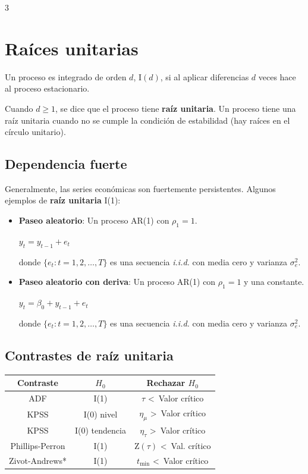 \documentclass[10pt, a4paper, landscape]{article}
\begin{document}
\begin{multicols}{3}
\columnbreak

\section*{Raíces unitarias}

Un proceso es integrado de orden \( d \), \( \text{I}(d) \), si al aplicar diferencias \( d \) veces hace al proceso estacionario.

Cuando \( d \geq 1 \), se dice que el proceso tiene \textbf{raíz unitaria}. Un proceso tiene una raíz unitaria cuando no se cumple la condición de estabilidad (hay raíces en el círculo unitario).

\subsection*{Dependencia fuerte}

Generalmente, las series económicas son fuertemente persistentes. Algunos ejemplos de \textbf{raíz unitaria} I(1):

\begin{itemize}[leftmargin=*]
	\item \textbf{Paseo aleatorio}: Un proceso AR(1) con \( \rho_{1} = 1 \).
	\begin{center}
		\( y_{t} = y_{t - 1} + e_{t} \)
	\end{center}
	donde \( \{ e_{t} : t = 1, 2, \ldots, T \} \) es una secuencia \textsl{i.i.d.} con media cero y varianza \( \sigma_{e}^{2} \).
	\item \textbf{Paseo aleatorio con deriva}: Un proceso AR(1) con \( \rho_{1} = 1 \) y una constante.
	\begin{center}
		\( y_{t} = \beta_{0} + y_{t - 1} + e_{t} \)
	\end{center}
	donde \( \{ e_{t} : t = 1, 2, \ldots, T \} \) es una secuencia \textsl{i.i.d.} con media cero y varianza \( \sigma_{e}^{2} \).
\end{itemize}

\subsection*{Contrastes de raíz unitaria}

\begin{center}
	\begin{tabular}{ c c c }
		Contraste       & \( H_{0} \)    & Rechazar \( H_{0} \)                              \\ \hline
		ADF             & I(1)           & \( \tau \) \textless \, Valor crítico             \\
		KPSS            & I(0) nivel     & \( \eta_{\mu} \) \textgreater \, Valor crítico    \\
		KPSS            & I(0) tendencia & \( \eta_{\tau} \) \textgreater \, Valor crítico   \\
		Phillips-Perron & I(1)           & \( \mathrm{Z}(\tau) \) \textless \, Val. crítico  \\
		Zivot-Andrews*  & I(1)           & \( t_{\mathrm{min}} \) \textless \, Valor crítico
	\end{tabular}
\end{center}


\end{multicols}
\end{document}
